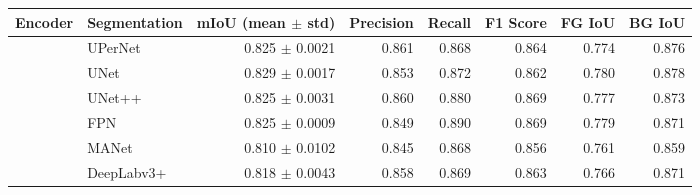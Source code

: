 \begin{table}
	\scriptsize
	\centering
	\begin{tabular}{llrrrrrr}
		\toprule{}
		\textbf{Encoder}         & \textbf{Segmentation}                                     & \multicolumn{1}{l}{\textbf{mIoU (mean $\pm$ std)}} & \multicolumn{1}{l}{\textbf{Precision}} & \multicolumn{1}{l}{\textbf{Recall}} & \multicolumn{1}{l}{\textbf{F1 Score}} & \multicolumn{1}{l}{\textbf{FG IoU}} & \multicolumn{1}{l}{\textbf{BG IoU}} \\
		\midrule{}
		\multirow{8}{*}{I-JEPA}  & UPerNet~\cite{DBLP:journals/corr/abs-1807-10221}          & 0.825 $\pm$ 0.0021                                 & 0.861                                  & 0.868                               & 0.864                                 & 0.774                               & 0.876                               \\
		                         & UNet~\cite{ronneberger2015unet}                           & 0.829 $\pm$ 0.0017                                 & 0.853                                  & 0.872                               & 0.862                                 & 0.780                               & 0.878                               \\
		                         & UNet++~\cite{zhou2019unetplusplus}                        & 0.825 $\pm$ 0.0031                                 & 0.860                                  & 0.880                               & 0.869                                 & 0.777                               & 0.873                               \\
		                         & FPN~\cite{DBLP:journals/corr/LinDGHHB16}                  & 0.825 $\pm$ 0.0009                                 & 0.849                                  & 0.890                               & 0.869                                 & 0.779                               & 0.871                               \\
		                         & MANet~\cite{Li_2022}                                      & 0.810 $\pm$ 0.0102                                 & 0.845                                  & 0.868                               & 0.856                                 & 0.761                               & 0.859                               \\
		                         & DeepLabv3+~\cite{DBLP:journals/corr/abs-1802-02611}       & 0.818 $\pm$ 0.0043                                 & 0.858                                  & 0.869                               & 0.863                                 & 0.766                               & 0.871                               \\

\end{tabular}
\end{table}
